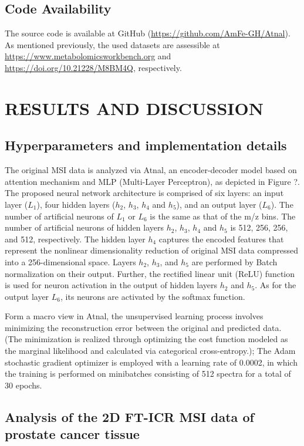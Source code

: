 \documentclass[journal=jacsat,manuscript=article]{achemso}
\begin{document}
\subsection{Code Availability}
The source code is available 
at GitHub (\href{https://github.com/AmFe-GH/Atnal}{https://github.com/AmFe-GH/Atnal}). 
As mentioned previously, the used datasets are assessible at 
\href{https://www.metabolomicsworkbench.org}{https://www.metabolomicsworkbench.org} and 
\href{https://doi.org/10.21228/M8BM4Q}{https://doi.org/10.21228/M8BM4Q}, respectively.

\section{RESULTS AND DISCUSSION}
\subsection*{Hyperparameters and implementation details}
The original MSI data is analyzed via Atnal, an encoder-decoder model 
based on attention mechanism and MLP 
(Multi-Layer Perceptron), as depicted in Figure ?. 
The proposed 
neural network architecture is comprised of six layers: an input 
layer ($L_1$), four hidden layers ($h_2$, $h_3$, $h_4$ and $h_5$), 
and an output layer ($L_6$). 
The number of artificial neurons of $L_1$ or $L_6$ 
is the same as that of the m/z  bins. The number of artificial neurons of 
hidden layers $h_2$, $h_3$, $h_4$ and $h_5$ 
is 512, 256, 256, and 512, respectively. 
The hidden layer $h_4$ captures the encoded features that represent 
the nonlinear dimensionality reduction 
of original MSI data compressed into
a 256-dimensional space. Layers $h_2$, $h_3$, and $h_5$
are performed by Batch normalization on their output. Further, 
the rectified linear unit \cite{nair2010rectified} (ReLU) function is used for neuron activation 
in the output of hidden layers $h_2$ and $h_5$. As for the output layer $L_6$, its neurons
are activated by the softmax function. 

Form a macro view in Atnal, the unsupervised learning process involves minimizing 
the reconstruction error between the original and predicted data. 
(The minimization is realized through  
optimizing the cost function modeled as the marginal likelihood and
calculated via categorical cross-entropy.); The Adam stochastic gradient optimizer 
is employed with a learning rate of 0.0002, in which the training is performed 
on minibatches consisting of 512 spectra for a total of 30 epochs. 
\subsection{Analysis of the 2D FT-ICR MSI data 
of prostate cancer tissue}
\end{document}
